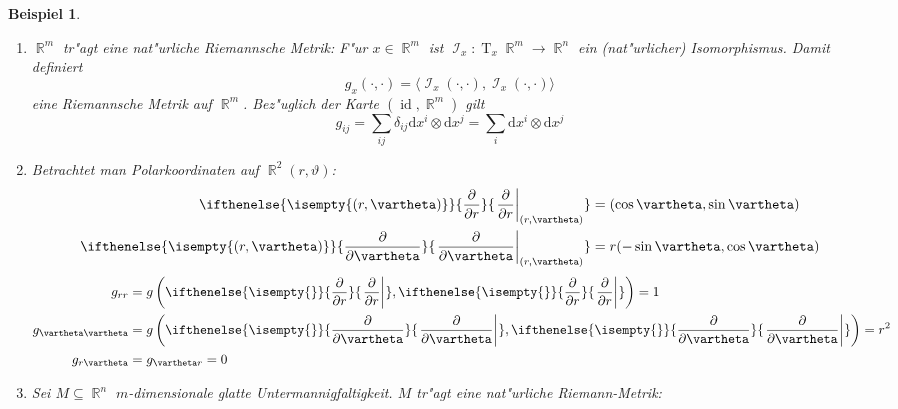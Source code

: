 \documentclass[paper=A4, twoside, chapterprefix=true, bibliography=totoc, headsepline]{scrbook}
\let\temp\phi
\let\phi\varphi
\let\varphi\temp
\let\temp\theta
\let\theta\vartheta
\let\vartheta\temp
\let\temp\epsilon
\let\epsilon\varepsilon
\let\varepsilon\temp
\let\temp\rho
\let\rho\varrho
\let\varrho\temp
\DeclareMathOperator{\R}{\mathbb{R}}
\DeclareMathOperator{\calI}{\mathcal{I}}
\DeclareMathOperator{\Id}{id} %
\DeclareMathOperator{\T}{T} %
\newcommand{\dop}{\mathrm{d}}
\newcommand{\pdifffrac}[3][]{\ifthenelse{\isempty{#1}}{\frac{\partial #2}{\partial #3}}{\left. \frac{\partial #2}{\partial #3} \right|_{#1}}}
\theoremstyle{plain}
\theoremstyle{nonumberplain}
\newtheorem{bsp}{Beispiel}
\theoremstyle{empty}
\theoremstyle{break}
\begin{document}
\begin{bsp}
  \begin{enumerate}[label=(\arabic*),leftmargin=*]
  \item $\R^m$ tr"agt eine nat"urliche Riemannsche Metrik: F"ur $x \in \R^m$ ist $\calI_x: \T_x\R^m \to \R^n$ ein (nat"urlicher) Isomorphismus.
    Damit definiert
    \[ g_x(\cdot,\cdot) = \langle \calI_x(\cdot,\cdot), \calI_x(\cdot,\cdot) \rangle \]
    eine Riemannsche Metrik auf $\R^m$. Bez"uglich der Karte $(\Id, \R^m)$ gilt
    \[ g_{ij} = \sum_{ij} \delta_{ij} \dop x^{i} \otimes \dop x^j = \sum_i \dop x^{i} \otimes \dop x^j \]
  \item Betrachtet man Polarkoordinaten auf $\R^2(r, \theta)$:
    \begin{align*}
      \pdifffrac[(r,\theta)]{}{r} &= (\cos \theta, \sin \theta)\\
      \pdifffrac[(r,\theta)]{}{\theta} &= r(-\sin \theta, \cos \theta)
    \end{align*}
    \begin{align*}
      g_{rr} &= g\left( \pdifffrac{}{r}, \pdifffrac{}{r} \right) = 1\\
      g_{\theta\theta} &= g\left( \pdifffrac{}{\theta}, \pdifffrac{}{\theta} \right) = r^2\\
      g_{r\theta} &= g_{\theta r} = 0
    \end{align*}
  \item Sei $M \subseteq \R^n$ $m$-dimensionale glatte Untermannigfaltigkeit. $M$ tr"agt eine nat"urliche Riemann-Metrik:
    \begin{center}
\end{center}
\end{enumerate}
\end{bsp}
\end{document}
